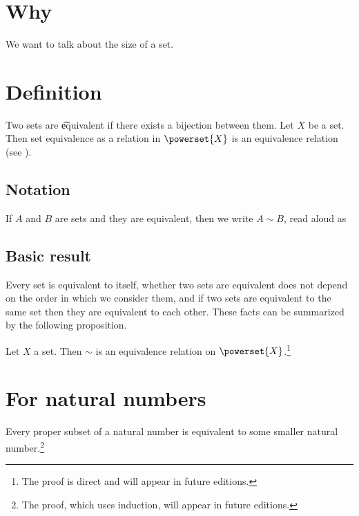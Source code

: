 

\section*{Why}

We want to talk about the size of a set.

\section*{Definition}

Two sets are \t{equivalent} if there exists a bijection between them.
Let $X$ be a set.
Then set equivalence as a relation in $\powerset{X}$ is an equivalence relation (see ).

\subsection*{Notation}

If $A$ and $B$ are sets and they are equivalent, then we write $A \sim B$, read aloud as 

\subsection*{Basic result}

Every set is equivalent to itself, whether two sets are equivalent does not depend on the order in which we consider them, and if two sets are equivalent to the same set then they are equivalent to each other.
These facts can be summarized by the following proposition.

\begin{proposition}
Let $X$ a set. Then $\sim$ is an equivalence relation on $\powerset{X}$.\footnote{The proof is direct and will appear in future editions.}\end{proposition}
\section*{For natural numbers}

\begin{proposition}
Every proper subset of a natural number is equivalent to some smaller natural number.\footnote{The proof, which uses induction, will appear in future editions.}\end{proposition}
